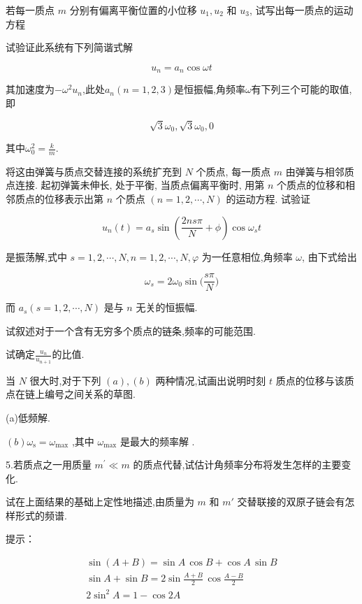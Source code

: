 \documentclass[UTF8,fontset=fandol,a4paper,11pt]{ctexart}
\begin{document}
若每一质点 \(m\) 分别有偏离平衡位置的小位移 \(u_{1}, u_{2}\) 和
\(u_{3}\), 试写出每一质点的运动方程

试验证此系统有下列简谐式解

\[
u_{ n } = a_{ n } \cos \omega t
\]

其加速度为\(-\omega^{2}u_{n}\),此处\(a_{n}(n=1,2,3)\)是恒振幅,角频率\(\omega\)有下列三个可能的取值,即

\[
\sqrt{ 3 } \omega_{ 0 } , \sqrt{ 3 } \omega_{ 0 } , 0
\]

其中\(\omega_{0}^{2}=\frac{k}{m}\).

将这由弹簧与质点交替连接的系统扩充到 \(N\) 个质点, 每一质点 \(m\)
由弹簧与相邻质点连接. 起初弹簧未伸长, 处于平衡, 当质点偏离平衡时, 用第
\(n\) 个质点的位移和相邻质点的位移表示出第 \(n\) 个质点
\((n=1,2, \cdots, N)\) 的运动方程. 试验证

\[
u_{ n } ( t ) = a_{ s } \sin \left( \frac{ 2 n s \pi } { N } + \phi \right) \cos \omega_{ s } t
\]

是振荡解,式中 \(s=1,2,\cdots,N,n=1,2,\cdots,N,\varphi\)
为一任意相位,角频率 \(\omega\), 由下式给出

\[
\omega_{ s } = 2 \omega_{ 0 } \sin \bigg ( \frac{ s \pi } { N } \bigg )
\]

而 \(a_{s}(s=1,2,\cdots,N)\) 是与 \(n\) 无关的恒振幅.

试叙述对于一个含有无穷多个质点的链条,频率的可能范围.

试确定\(\frac{u_{n}}{u_{n+1}}\)的比值.

当 \(N\) 很大时,对于下列 \((a),(b)\) 两种情况,试画出说明时刻 \(t\)
质点的位移与该质点在链上编号之间关系的草图.

(a)低频解.

\((b)\omega_{\mathrm{s}}=\omega_{\mathrm{max}}\) ,其中
\(\omega_{\mathrm{max}}\) 是最大的频率解 .

5.若质点之一用质量 \(m^{\prime} \ll m\)
的质点代替,试估计角频率分布将发生怎样的主要变化.

试在上面结果的基础上定性地描述,由质量为 \(m\) 和 \(m'\)
交替联接的双原子链会有怎样形式的频谱.

提示：

\[
\begin{array}{r} { \sin ( A + B ) = \sin A \, \cos B + \cos A \, \sin B } \\{ \sin A + \sin B = 2 \sin \frac{ A + B } { 2 } \, \cos \frac{ A - B } { 2 } } \\{ 2 \sin^{2} A = 1 - \cos 2 A } \end{array}
\]
\end{document}
